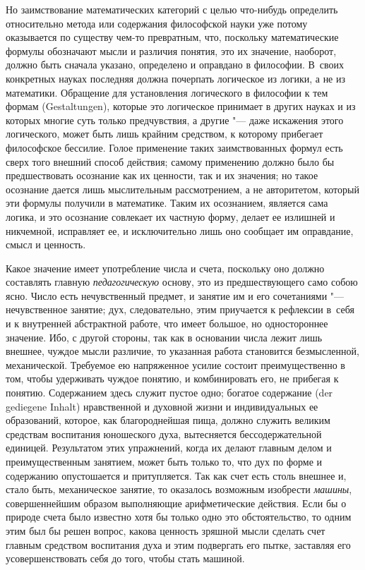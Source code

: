 Но заимствование математических категорий с целью что-нибудь определить
относительно метода или содержания философской науки уже потому оказывается по
существу чем-то превратным, что, поскольку математические формулы обозначают
мысли и различия понятия, это их значение, наоборот, должно быть сначала
указано, определено и оправдано в философии. В~своих конкретных науках
последняя должна почерпать логическое из логики, а не из математики. Обращение
для установления логического в философии к тем формам (Gestaltungen), которые
это логическое принимает в других науках и из которых многие суть только
предчувствия, а другие "--- даже искажения этого логического, может быть лишь
крайним средством, к которому прибегает философское бессилие. Голое применение
таких заимствованных формул есть сверх того внешний способ действия; самому
применению должно было бы предшествовать осознание как их ценности, так и их
значения; но такое осознание дается лишь мыслительным рассмотрением, а не
авторитетом, который эти формулы получили в математике. Таким их осознанием,
является сама логика, и это осознание совлекает их частную форму, делает ее
излишней и никчемной, исправляет ее, и исключительно лишь оно сообщает им
оправдание, смысл и ценность.

Какое значение имеет употребление числа и счета, поскольку оно должно
составлять главную {\em педагогическую} основу, это из предшествующего само
собою ясно. Число есть нечувственный предмет, и занятие им и его сочетаниями
"--- нечувственное занятие; дух, следовательно, этим приучается к рефлексии
в~себя и к внутренней абстрактной работе, что имеет большое, но одностороннее
значение. Ибо, с другой стороны, так как в основании числа лежит лишь внешнее,
чуждое мысли различие, то указанная работа становится безмысленной,
механической. Требуемое ею напряженное усилие состоит преимущественно в том,
чтобы удерживать чуждое понятию, и комбинировать его, не прибегая к понятию.
Содержанием здесь служит пустое одно; богатое содержание (der gediegene Inhalt)
нравственной и духовной жизни и индивидуальных ее образований, которое, как
благороднейшая пища, должно служить великим средствам воспитания юношеского
духа, вытесняется бессодержательной единицей. Результатом этих упражнений,
когда их делают главным делом и преимущественным занятием, может быть только
то, что дух по форме и содержанию опустошается и притупляется. Так как счет
есть столь внешнее и, стало быть, механическое занятие, то оказалось возможным
изобрести {\em машины}, совершеннейшим образом выполняющие арифметические
действия. Если бы о природе счета было известно хотя бы только одно это
обстоятельство, то одним этим был бы решен вопрос, какова ценность зряшной
мысли сделать счет главным средством воспитания духа и этим подвергать его
пытке, заставляя его усовершенствовать себя до того, чтобы стать машиной.

